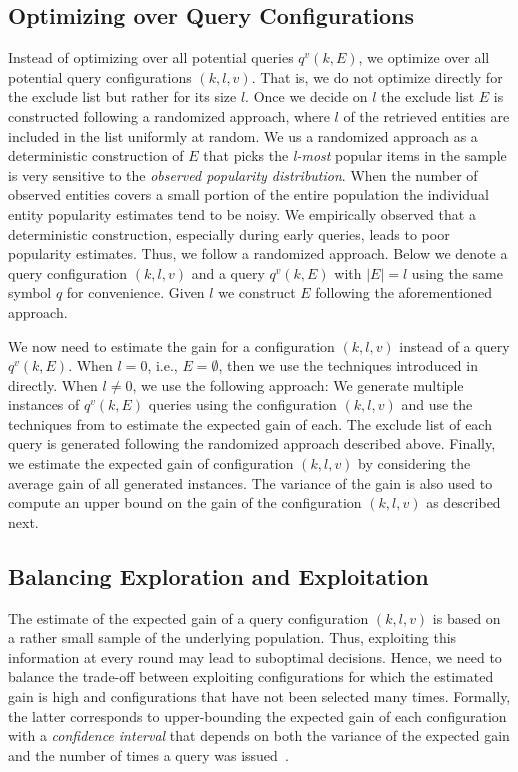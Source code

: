 \subsection{Optimizing over Query Configurations}
\label{sec:config}
Instead of optimizing over all potential queries $q^v(k,E)$, we optimize over all potential query configurations $(k,l,v)$. That is, we do not optimize directly for the exclude list but rather for its size $l$. Once we decide on $l$ the exclude list $E$ is constructed following a randomized approach, where $l$ of the retrieved entities are included in the list uniformly at random. We us a randomized approach as a deterministic construction of $E$ that picks the {\em l-most} popular items in the sample is very sensitive to the {\em observed popularity distribution}. When the number of observed entities covers a small portion of the entire population the individual entity popularity estimates tend to be noisy. We empirically observed that a deterministic construction, especially during early queries, leads to poor popularity estimates. Thus, we follow a randomized approach. Below we denote a query configuration $(k,l,v)$ and a query $q^v(k,E)$ with $|E| = l$ using the same symbol $q$ for convenience. Given $l$ we construct $E$ following the aforementioned approach.

We now need to estimate the gain for a configuration $(k,l,v)$ instead of a query $q^v(k,E)$. When $l = 0$, i.e., $E = \emptyset$, then we use the techniques introduced in  directly. When $l \neq 0$, we use the following approach: We generate multiple instances of $q^v(k,E)$ queries using the configuration $(k,l,v)$ and use the techniques from  to estimate the expected gain of each. The exclude list of each query is generated following the randomized approach described above. Finally, we estimate the expected gain of configuration $(k,l,v)$ by considering the average gain of all generated instances. The variance of the gain is also used to compute an upper bound on the gain of the configuration $(k,l,v)$ as described next.

\subsection{Balancing Exploration and Exploitation}
\label{sec:balancing}
The estimate of the expected gain of a query configuration $(k,l,v)$ is based on a rather small sample of the underlying population. Thus, exploiting this information at every round may lead to suboptimal decisions. Hence, we need to balance the trade-off between exploiting configurations for which the estimated gain is high and configurations that have not been selected many times. Formally, the latter corresponds to upper-bounding the expected gain of each configuration with a {\em confidence interval} that depends on both the variance of the expected gain and the number of times a query was issued~\cite{Auer:2003}.

